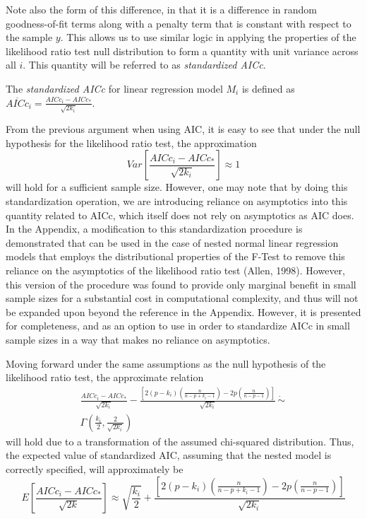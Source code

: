 		Note also the form of this difference, in that it is a difference in random goodness-of-fit terms along with a penalty term that is constant with respect to the
		sample $y$. This allows us to use similar logic in applying the properties of the likelihood ratio test null distribution to form a quantity with unit variance
		across all $i$. This quantity will be referred to as \textit{standardized AICc}.

		\begin{definition}
			The \textit{standardized AICc} for linear regression model $M_i$ is defined as $\overline{AICc}_i = \frac{AICc_i - AICc_*}{\sqrt{2k_i}}$.
		\end{definition}

		From the previous argument when using AIC, it is easy to see that under the null hypothesis for the likelihood ratio test, the approximation
		\begin{equation}
			Var \left[ \frac{AICc_i - AICc_*}{\sqrt{2k_i}} \right] \approx 1 
		\end{equation}
		will hold for a sufficient sample size. However, one may note that by doing this standardization operation, we are introducing reliance on asymptotics into this quantity
		related to AICc, which itself does not rely on asymptotics as AIC does. In the Appendix, a modification to this standardization procedure is demonstrated that can
		be used in the case of nested normal linear regression models that employs the distributional properties of the F-Test to remove this reliance on the asymptotics of the
		likelihood ratio test (Allen, 1998). However, this version of the procedure was found to provide only marginal benefit in small sample sizes for a substantial cost in
		computational complexity, and thus will not be expanded upon beyond the reference in the Appendix. However, it is presented for completeness, and as an option to use
		in order to standardize AICc in small sample sizes in a way that makes no reliance on asymptotics.
		
		Moving forward under the same assumptions as the null hypothesis of the likelihood ratio test, the approximate relation
		\begin{equation}
			\begin{split}
				\frac{AICc_i - AICc_*}{\sqrt{2k_i}} - \frac{\left[ 2(p-k_i) \left( \frac{n}{n-p+k_i-1} \right) - 2p \left( \frac{n}{n-p-1} \right) \right]}{\sqrt{2k_i}} \, \dot\sim \, \\ 
				\Gamma \left( \frac{k_i}{2}, \frac{2}{\sqrt{2k_i}} \right)
			\end{split}
		\end{equation}
		will hold due to a transformation of the assumed chi-squared distribution. Thus, the expected value of standardized AIC, assuming
		that the nested model is correctly specified, will approximately be
		\begin{equation}
			E \left[ \frac{AICc_i - AICc_*}{\sqrt{2k}} \right] \approx \sqrt{\frac{k_i}{2}} + \frac{\left[ 2(p-k_i) \left( \frac{n}{n-p+k_i-1} \right) - 2p \left( \frac{n}{n-p-1} \right) \right]}{\sqrt{2k_i}}
		\end{equation}

